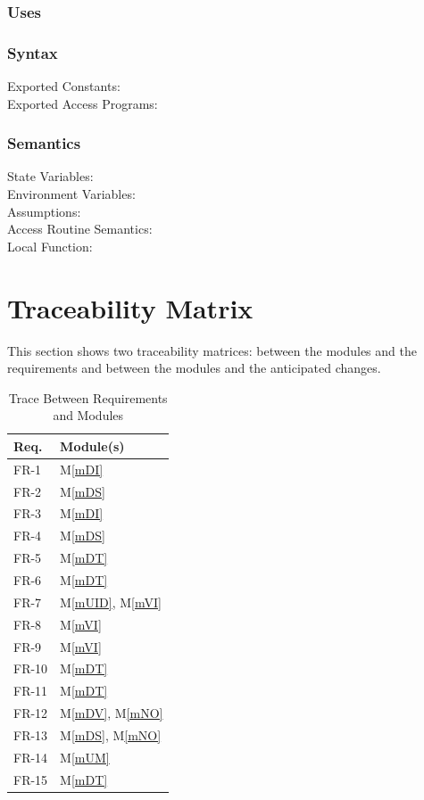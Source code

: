 \documentclass[12pt, titlepage]{article}
\newcommand{\mref}[1]{M\ref{#1}}
\begin{document}
\begin{description}
\begin{description}
\subsubsection{Uses}

\subsubsection{Syntax}
\begin{description}
  \item[Exported Constants:] 
  \item[Exported Access Programs:] 
\end{description}

\subsubsection{Semantics}
\begin{description}
  \item[State Variables:]
  \item[Environment Variables:]  
  \item[Assumptions:] 
  \item[Access Routine Semantics:] 
  \item[Local Function:] 
\end{description}

\section{Traceability Matrix} \label{SecTM}

This section shows two traceability matrices: between the modules and the
requirements and between the modules and the anticipated changes.

\begin{table}[H]
\centering
\begin{tabular}{p{} p{}}
\toprule
\textbf{Req.} & \textbf{Module(s)}\\
\midrule
FR-1 & \mref{mDI} \\
FR-2 & \mref{mDS} \\
FR-3 & \mref{mDI} \\
FR-4 & \mref{mDS} \\
FR-5 & \mref{mDT} \\
FR-6 & \mref{mDT} \\
FR-7 & \mref{mUID}, \mref{mVI} \\
FR-8 & \mref{mVI} \\
FR-9 & \mref{mVI} \\
FR-10 & \mref{mDT} \\
FR-11 & \mref{mDT} \\
FR-12 & \mref{mDV}, \mref{mNO} \\
FR-13 & \mref{mDS}, \mref{mNO} \\
FR-14 & \mref{mUM} \\
FR-15 & \mref{mDT} \\
\bottomrule
\end{tabular}
\caption{Trace Between Requirements and Modules}
\label{TblRT}
\end{table}


\end{description}
\end{description}
\end{document}
